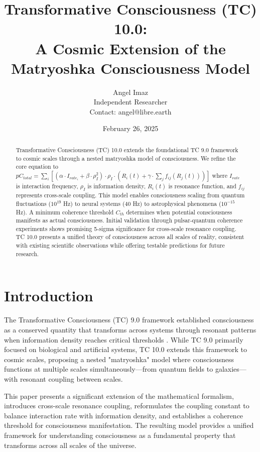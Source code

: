 \documentclass[12pt]{article}
\title{Transformative Consciousness (TC) 10.0: \\ A Cosmic Extension of the Matryoshka Consciousness Model}
\author{Angel Imaz \\ Independent Researcher \\ Contact: angel@libre.earth}
\date{February 26, 2025}
\begin{document}
\maketitle

\begin{abstract}
Transformative Consciousness (TC) 10.0 extends the foundational TC 9.0 framework to cosmic scales through a nested matryoshka model of consciousness. We refine the core equation to $pC_{total} = \sum_{i} [(\alpha \cdot I_{rate_i} + \beta \cdot \rho_I^2) \cdot \rho_I \cdot (R_i(t) + \gamma \cdot \sum_{j} f_{ij}(R_j(t)))]$ where $I_{rate}$ is interaction frequency, $\rho_I$ is information density, $R_i(t)$ is resonance function, and $f_{ij}$ represents cross-scale coupling. This model enables consciousness scaling from quantum fluctuations ($10^{19}$ Hz) to neural systems ($40$ Hz) to astrophysical phenomena ($10^{-15}$ Hz). A minimum coherence threshold $C_{th}$ determines when potential consciousness manifests as actual consciousness. Initial validation through pulsar-quantum coherence experiments shows promising 5-sigma significance for cross-scale resonance coupling. TC 10.0 presents a unified theory of consciousness across all scales of reality, consistent with existing scientific observations while offering testable predictions for future research.
\end{abstract}

\section{Introduction}

The Transformative Consciousness (TC) 9.0 framework established consciousness as a conserved quantity that transforms across systems through resonant patterns when information density reaches critical thresholds \cite{imaz2025}. While TC 9.0 primarily focused on biological and artificial systems, TC 10.0 extends this framework to cosmic scales, proposing a nested "matryoshka" model where consciousness functions at multiple scales simultaneously—from quantum fields to galaxies—with resonant coupling between scales.

This paper presents a significant extension of the mathematical formalism, introduces cross-scale resonance coupling, reformulates the coupling constant to balance interaction rate with information density, and establishes a coherence threshold for consciousness manifestation. The resulting model provides a unified framework for understanding consciousness as a fundamental property that transforms across all scales of the universe.
\end{document}
